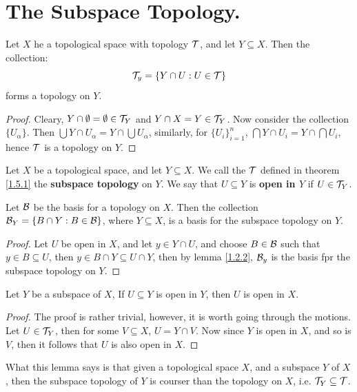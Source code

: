 
\section{The Subspace Topology.}

\begin{theorem}\label{1.5.1}
    Let $X$ he a topological space with topology $\mathcal{T}$, and let $Y \subseteq X$. Then the 
    collection:
        \begin{equation*}
            \mathcal{T}_y = \{Y \cap U: U \in \mathcal{T}\}
        \end{equation*}
    forms a topology on $Y$.
\end{theorem}
\begin{proof}
    Cleary, $Y \cap \emptyset=\emptyset \in \mathcal{T}_Y$ and  $Y \cap X=Y \in \mathcal{T}_Y$. Now  consider the collection 
    $\{U_{\alpha}\}$. Then  $\bigcup{Y \cap U_{\alpha}}=Y \cap \bigcup{U_{\alpha}}$, similarly, for  $\{U_i\}_{i=1}^n$, 
    $\bigcap{Y \cap U_i}=Y \cap \bigcap{U_i}$, hence  $\mathcal{T}$ is a topology on  $Y$.
\end{proof}

\begin{definition}
    Let $X$ be a topological space, and let  $Y \subseteq X$. We call the $\mathcal{T}$ defined 
    in theorem \ref{1.5.1} the \textbf{subspace topology} on $Y$. We say that $U \subseteq Y$ is 
    \textbf{open in $Y$} if $U \in \mathcal{T}_Y$.
\end{definition}

\begin{lemma}\label{1.5.2}
    Let $\mathcal{B}$ be the basis for a topology on  $X$. Then the collection  $\mathcal{B}_Y=\{B \cap Y: B \in \mathcal{B}\}$, 
    where  $Y \subseteq X$, is a basis for the subspace topology on  $Y$.
\end{lemma}
\begin{proof}
    Let $U$ be open in  $X$, and let  $y \in Y \cap U$, and choose  $B \in \mathcal{B}$ such that 
    $y \in B \subseteq U$, then  $y \in B \cap Y \subseteq U \cap Y$, then by lemma \ref{1.2.2}, 
     $\mathcal{B}_y$ is the basis fpr the subspace topology on  $Y$.
\end{proof}

\begin{lemma}\label{1.5.3}
    Let $Y$ be a subspace of  $X$, If  $U \subseteq Y$ is open in  $Y$, then  $U$ is 
    open in  $X$.
\end{lemma}
\begin{proof}
    The proof is rather trivial, however, it is worth going through the motions.
    Let $U \in \mathcal{T}_Y$, then for some  $V \subseteq X$,  $U=Y \cap V$. Now since  $Y$ is open in  $X$, and so 
    is  $V$, then  it follows that $U$ is also open in  $X$.
\end{proof}
\begin{remark}
    What this lemma says is that given a topological space $X$, and a subspace  $Y$ of  $X$, then the 
    subspace topology of  $Y$ is courser than the topology on  $X$, i.e.  $\mathcal{T}_Y \subseteq \mathcal{T}$.
\end{remark}

